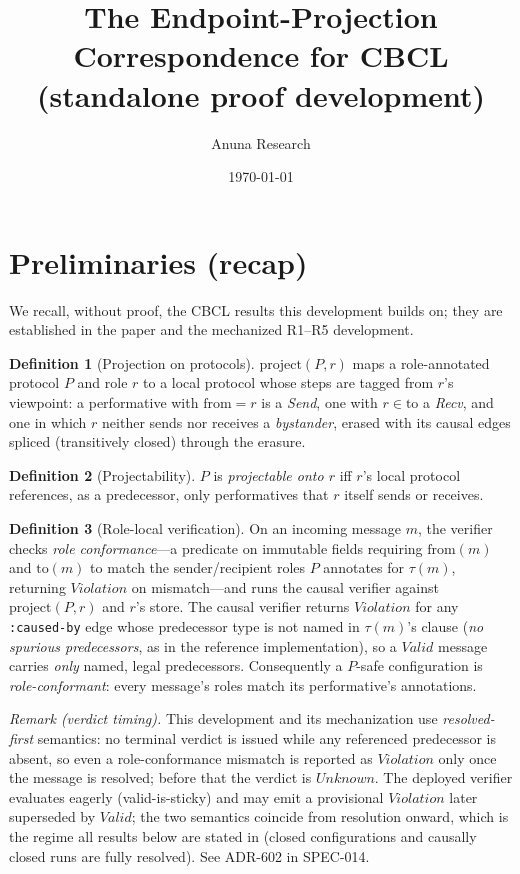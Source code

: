 \documentclass[11pt]{article}
\title{The Endpoint-Projection Correspondence for CBCL\\(standalone proof development)}
\author{Anuna Research}
\date{\today}
\newcommand{\code}[1]{\texttt{#1}}
\newcommand{\caused}{\code{:caused-by}}
\theoremstyle{definition}
\newtheorem{definition}{Definition}
\theoremstyle{plain}
\begin{document}
\maketitle

\section{Preliminaries (recap)}
\label{sec:prelim}
We recall, without proof, the CBCL results this development builds on; they are
established in the paper and the mechanized R1--R5 development.

\begin{definition}[Projection on protocols]
\label{def:proj}
$\mathrm{project}(P,r)$ maps a role-annotated protocol $P$ and role $r$ to a local
protocol whose steps are tagged from $r$'s viewpoint: a performative with
$\mathrm{from}=r$ is a \emph{Send}, one with $r\in\mathrm{to}$ a \emph{Recv}, and one in
which $r$ neither sends nor receives a \emph{bystander}, erased with its causal edges
spliced (transitively closed) through the erasure.
\end{definition}

\begin{definition}[Projectability]
\label{def:projectable}
$P$ is \emph{projectable onto $r$} iff $r$'s local protocol references, as a
predecessor, only performatives that $r$ itself sends or receives.
\end{definition}

\begin{definition}[Role-local verification]
\label{def:rolelocal}
On an incoming message $m$, the verifier checks \emph{role conformance}---a predicate on
immutable fields requiring $\mathrm{from}(m)$ and $\mathrm{to}(m)$ to match the
sender/recipient roles $P$ annotates for $\tau(m)$, returning $\mathit{Violation}$ on
mismatch---and runs the causal verifier against $\mathrm{project}(P,r)$ and $r$'s store.
The causal verifier returns $\mathit{Violation}$ for any \caused{} edge whose predecessor
type is not named in $\tau(m)$'s clause (\emph{no spurious predecessors}, as in the
reference implementation), so a $\mathit{Valid}$ message carries \emph{only} named, legal
predecessors.
Consequently a $P$-safe configuration is \emph{role-conformant}: every message's roles
match its performative's annotations.
\end{definition}

\noindent\emph{Remark (verdict timing).}
This development and its mechanization use \emph{resolved-first} semantics: no terminal
verdict is issued while any referenced predecessor is absent, so even a role-conformance
mismatch is reported as $\mathit{Violation}$ only once the message is resolved; before
that the verdict is $\mathit{Unknown}$.
The deployed verifier evaluates eagerly (valid-is-sticky) and may emit a provisional
$\mathit{Violation}$ later superseded by $\mathit{Valid}$; the two semantics coincide from
resolution onward, which is the regime all results below are stated in (closed
configurations and causally closed runs are fully resolved).
See ADR-602 in SPEC-014.
\end{document}
